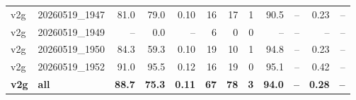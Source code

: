 \begin{table}[t]
\begin{tabular}{llrrrrrrrrrr}
v2g & 20260519\_1947 & 81.0 & 79.0 & 0.10 & 16 & 17 & 1 & 90.5 & -- & 0.23 & -- \\
v2g & 20260519\_1949 & -- & 0.0 & -- & 6 & 0 & 0 & -- & -- & -- & -- \\
v2g & 20260519\_1950 & 84.3 & 59.3 & 0.10 & 19 & 10 & 1 & 94.8 & -- & 0.23 & -- \\
v2g & 20260519\_1952 & 91.0 & 95.5 & 0.12 & 16 & 19 & 0 & 95.1 & -- & 0.42 & -- \\
\textbf{v2g} & \textbf{all} & \textbf{88.7} & \textbf{75.3} & \textbf{0.11} & \textbf{67} & \textbf{78} & \textbf{3} & \textbf{94.0} & \textbf{--} & \textbf{0.28} & \textbf{--} \\
\bottomrule
\end{tabular}
\end{table}
